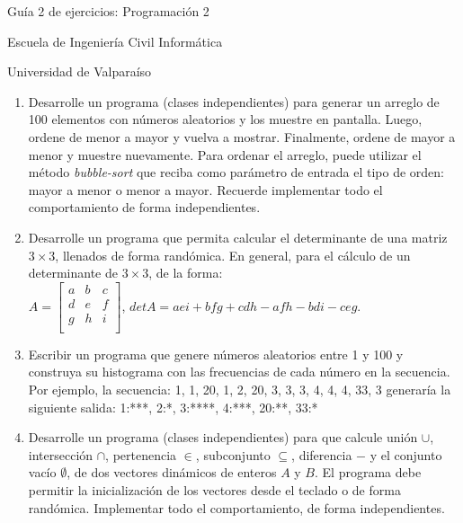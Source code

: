 \documentclass{article}
\begin{document}
	\centerline{\sc \large Gu\'ia 2 de ejercicios: Programaci\'on 2}
	\centerline{\sc \normalsize Escuela de Ingenier\'ia Civil Inform\'atica}
	\centerline{\sc \normalsize  Universidad de Valpara\'iso}

	\vspace{1pc}

	\begin{enumerate}
	    \item Desarrolle un programa (clases independientes) para generar un arreglo de 100 elementos con n\'umeros aleatorios y los muestre en pantalla. Luego, ordene de menor a mayor y vuelva a
mostrar. Finalmente, ordene de mayor a menor y muestre nuevamente. Para ordenar el arreglo, puede utilizar el m\'etodo \emph{bubble-sort} que reciba como par\'ametro de entrada el tipo de orden: mayor a menor o menor a mayor. Recuerde implementar todo el comportamiento de forma independientes.
        \item Desarrolle un programa que permita calcular el determinante de una matriz $3 \times 3$, llenados de forma rand\'omica. En general, para el c\'alculo de un determinante de $3 \times 3$, de la forma: \\
        $A = \left[
        \begin{array}{ccc}
            a & b & c \\
			d & e & f \\
			g & h & i \\
		\end{array}
        \right]$,
        $detA = aei + bfg + cdh - afh - bdi - ceg$.
        \item Escribir un programa que genere n\'umeros aleatorios entre 1 y 100 y construya su histograma con las frecuencias de cada n\'umero en la secuencia. Por ejemplo, la secuencia: 1, 1, 20, 1, 2, 20, 3, 3, 3, 4, 4, 4, 33, 3 generar\'ia la siguiente salida: 1:***, 2:*, 3:****, 4:***, 20:**, 33:*
		\item Desarrolle un programa (clases independientes) para que calcule uni\'on $\cup$, intersecci\'on $\cap$, pertenencia $\in$, subconjunto $\subseteq$, diferencia $-$ y el conjunto vac\'io $\emptyset$, de dos vectores din\'amicos de enteros $A$ y $B$. El programa debe permitir la inicializaci\'on de los vectores desde el teclado o de forma rand\'omica. Implementar todo el comportamiento, de forma independientes.
\end{enumerate}
\end{document}
